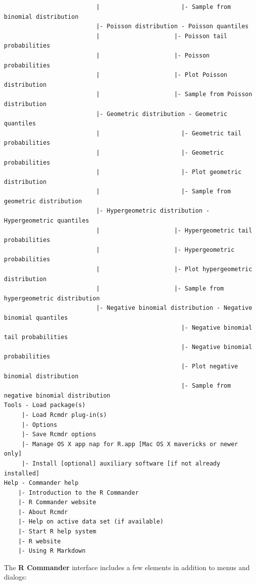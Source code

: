 \documentclass{article}%
\begin{document}
\begin{verbatim}
                          |                       |- Sample from binomial distribution
                          |- Poisson distribution - Poisson quantiles
                          |                     |- Poisson tail probabilities
                          |                     |- Poisson probabilities
                          |                     |- Plot Poisson distribution
                          |                     |- Sample from Poisson distribution
                          |- Geometric distribution - Geometric quantiles
                          |                       |- Geometric tail probabilities
                          |                       |- Geometric probabilities
                          |                       |- Plot geometric distribution
                          |                       |- Sample from geometric distribution
                          |- Hypergeometric distribution - Hypergeometric quantiles
                          |                     |- Hypergeometric tail probabilities
                          |                     |- Hypergeometric probabilities
                          |                     |- Plot hypergeometric distribution
                          |                     |- Sample from hypergeometric distribution
                          |- Negative binomial distribution - Negative binomial quantiles
                                                  |- Negative binomial tail probabilities
                                                  |- Negative binomial probabilities
                                                  |- Plot negative binomial distribution
                                                  |- Sample from negative binomial distribution
Tools - Load package(s)
     |- Load Rcmdr plug-in(s)
     |- Options
     |- Save Rcmdr options
     |- Manage OS X app nap for R.app [Mac OS X mavericks or newer only]
     |- Install [optional] auxiliary software [if not already installed]
Help - Commander help
    |- Introduction to the R Commander
    |- R Commander website
    |- About Rcmdr
    |- Help on active data set (if available)
    |- Start R help system
    |- R website
    |- Using R Markdown
\end{verbatim}

The \textbf{R Commander} interface includes a few elements in addition to
menus and dialogs:
\end{document}
